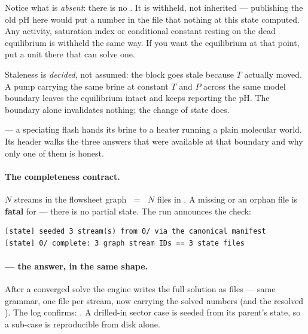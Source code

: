 \documentclass[11pt,a4paper]{article}
\begin{document}
\begin{pitfall}
Notice what is \emph{absent}: there is no .  It is withheld, not
inherited --- publishing the old pH here would put a number in the file
that nothing at this state computed.  Any activity, saturation index or
conditional constant resting on the dead equilibrium is withheld the same
way.  If you want the equilibrium at that point, put a unit there that can
solve one.
\end{pitfall}

Staleness is \emph{decided}, not assumed: the block goes stale because $T$
actually moved.  A pump carrying the same brine at constant $T$ and $P$
across the same model boundary leaves the equilibrium intact and keeps
reporting the pH.  The boundary alone invalidates nothing; the change of
state does.

\begin{tutoriallink}
 --- a speciating
flash hands its brine to a heater running a plain molecular world.  Its
 header walks the three answers that were available
at that boundary and why only one of them is honest.
\end{tutoriallink}

\paragraph{The completeness contract.}  $N$ streams in the flowsheet
graph $\;=\;$ $N$ files in .  A missing or an orphan file is
\textbf{fatal} for  --- there is no partial state.
The run announces the check:

\begin{lstlisting}
[state] seeded 3 stream(s) from 0/ via the canonical manifest
[state] 0/ complete: 3 graph stream IDs == 3 state files
\end{lstlisting}

\paragraph{ --- the answer, in the same shape.}  After
a converged solve the engine writes the full solution as
 files --- same grammar, one file per stream,
now carrying the solved numbers (and the resolved ).  The
log confirms: .  A drilled-in sector case
is seeded from its parent's  state, so a sub-case is
reproducible from disk alone.
\end{document}
